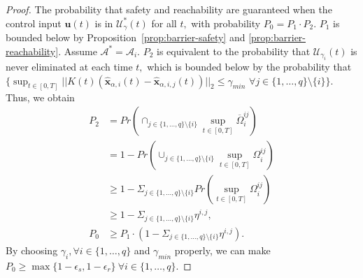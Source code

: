 \documentclass[journal]{IEEEtran}
\begin{document}
\begin{proof}
The probability that safety and reachability are guaranteed when the control input $\mathbf{u}(t)$ is in $\mathcal{U}_{\gamma}^{\ast}(t)$ for all $t,$ with probability $P_0 = P_1 \cdot P_2.$ $P_1$ is bounded below by Proposition~\ref{prop:barrier-safety} and \ref{prop:barrier-reachability}. Assume $\mathcal{A}^{\ast} = \mathcal{A}_i.$ $P_2$ is equivalent to the probability that $\mathcal{U}_{\gamma_i}(t)$ is never eliminated at each time $t,$ which is bounded below by the probability that $\{\sup_{t \in [0,T]} ||K(t)\left(\mathbf{\hat{x}}_{\alpha,i}(t) - \mathbf{\hat{x}}_{\alpha,i,j}(t)\right) ||_2 \leq \gamma_{min}$ $ \forall j \in \{1,\ldots,q\} \setminus \{i\}\}.$ Thus, we obtain
\begin{align}
    P_2 &= Pr(\cap_{j \in \{1,\ldots,q\} \setminus \{i\}} \sup_{t \in [0, T]} \overline{\Omega}_i^{ij} ) \nonumber\\
    &= 1 - Pr(\cup_{j \in \{1,\ldots,q\} \setminus \{i\}} \sup_{t \in [0, T]} \Omega_i^{ij} ) \nonumber\\
    &\geq 1 - \Sigma_{j \in \{1,\ldots,q\} \setminus \{i\}} Pr(\sup_{t \in [0, T]} \Omega_i^{ij} ) \nonumber\\
    &\geq 1 - \Sigma_{j \in \{1,\ldots,q\} \setminus \{i\}} \eta^{i,j}, \label{eq:P_2-lower-bound}\\
    P_0 &\geq P_1 \cdot \left( 1 - \Sigma_{j \in \{1,\ldots,q\} \setminus \{i\}} \eta^{i,j} \right). 
    \label{eq:P_0-lower-bound}
\end{align}
By choosing $\gamma_i, \forall i \in \{1,\ldots,q\}$ and $\gamma_{min}$ properly, we can make $P_0 \geq \max \{1-\epsilon_s, 1-\epsilon_r\} \ \forall i \in \{1,\ldots,q\}.$
\end{proof}
\end{document}
